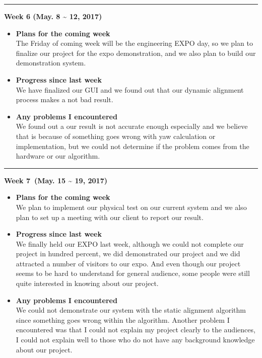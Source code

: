 	\rule{\textwidth}{0.5pt}

	\begin{center}
		\textbf{Week 6 (May. 8 {\textasciitilde{}} 12, 2017)}
	\end{center}
	\begin{itemize}
		\item \textbf{Plans for the coming week}
		\\The Friday of coming week will be the engineering EXPO day, so we plan to finalize our project for the expo demonstration, and we also plan to build our demonstration system.\\

		\item \textbf{Progress since last week}
		\\We have finalized our GUI and we found out that our dynamic alignment process makes a not bad result.\\

		\item \textbf{Any problems I encountered}
		\\We found out a our result is not accurate enough especially and we believe that is because of something goes wrong with yaw calculation or implementation, but we could not determine if the problem comes from the hardware or our algorithm.\\
	\end{itemize}

	\rule{\textwidth}{0.5pt}

	\begin{center}
		\textbf{Week 7 (May. 15 {\textasciitilde{}} 19, 2017)}
	\end{center}
	\begin{itemize}
		\item \textbf{Plans for the coming week}
		\\We plan to implement our physical test on our current system and we also plan to set up a meeting with our client to report our result.\\

		\item \textbf{Progress since last week}
		\\We finally held our EXPO last week, although we could not complete our project in hundred percent, we did demonstrated our project and we did attracted a number of visitors to our expo. And even though our project seems to be hard to understand for general audience, some people were still quite interested in knowing about our project.\\

		\item \textbf{Any problems I encountered}
		\\We could not demonstrate our system with the static alignment algorithm since something goes wrong within the algorithm. Another problem I encountered was that I could not explain my project clearly to the audiences, I could not explain well to those who do not have any background knowledge about our project.\\
	\end{itemize}


